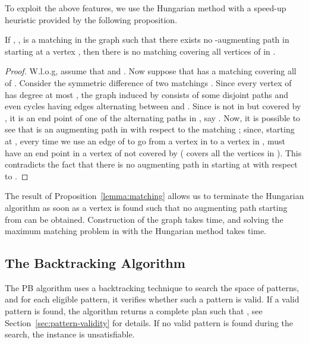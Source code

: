 \documentclass[runningheads,proof]{llncs}
\begin{document}
To exploit the above features, we use the Hungarian method with a speed-up heuristic provided by the following proposition.
\begin{proposition}
\label{lemma:matching}
If , , is a matching in the graph  such that there exists no -augmenting path in  starting at a vertex , then there is no matching covering all vertices of  in .
\end{proposition}
\begin{proof}
W.l.o.g, assume that  and . Now suppose that  has a matching  covering all of .
Consider the symmetric difference of two matchings . 
Since every vertex of  has degree at most , the graph induced by  consists of some disjoint paths and even cycles having edges alternating between  and . 
Since  is not in  but covered by , it is an end point of one of the alternating paths in , say . 
Now, it is possible to see that  is an augmenting path in  with respect to the matching ; since, starting at , every time we use an edge of  to go from a vertex in  to a vertex in ,  must have an end point in a vertex of  not covered by  ( covers all the vertices in ). 
This contradicts the fact that there is no augmenting path in  starting at  with respect to .\squareforqed
\end{proof}

The result of Proposition~\ref{lemma:matching} allows us to terminate the Hungarian algorithm as soon as a vertex  is found such that no augmenting path starting from  can be obtained.
Construction of the graph takes  time, and solving the maximum matching problem in  with the Hungarian method takes  time.



\subsection{The Backtracking Algorithm}
\label{sec:pb-backtracking}

The PB algorithm uses a backtracking technique to search the space of patterns, and for each eligible pattern, it verifies whether such a pattern is valid.  
If a valid pattern  is found, the algorithm returns a complete plan  such that , see Section~\ref{sec:pattern-validity} for details.  
If no valid pattern is found during the search, the instance is unsatisfiable.
\end{document}
